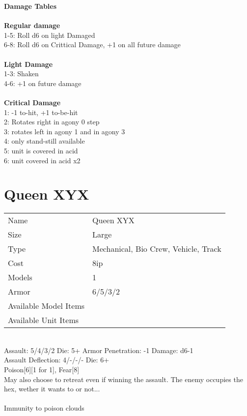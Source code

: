 {\bf Damage Tables} \\
\ \\ {\bf Regular damage } \\
1-5: Roll d6 on light Damaged \\
6-8: Roll d6 on Crittical Damage, +1 on all future damage \\
\ \\ {\bf Light Damage } \\
1-3: Shaken \\
4-6: +1 on future damage \\
\ \\ {\bf Critical Damage } \\
1: -1 to-hit, +1 to-be-hit \\
2: Rotates right in agony 0 step \\
3: rotates left in agony 1 and in agony 3 \\
4: only stand-still available \\
5: unit is covered in acid \\
6: unit covered in acid x2 \\









\pagebreak

\section{ Queen XYX }

\begin{tabular}{ll}
  Name & Queen XYX \\
  Size & Large\\
  Type & Mechanical, Bio Crew, Vehicle, Track\\
  Cost & 8ip\\
  Models & 1\\
  Armor & 6/5/3/2\\
  Available Model Items &  \\
  Available Unit Items &  \\
\end{tabular}

\ \\
Assault: 5/4/3/2 Die: 5+ Armor Penetration: -1 Damage: d6-1 \\
Assault Deflection: 4/-/-/- Die: 6+\\
\indent Poison[6][1 for 1], Fear[8] \\ May also choose to retreat even if winning the assault. The enemy occupies the hex, wether it wants to or not... \\
\ \\
Immunity to poison clouds
\ \\


